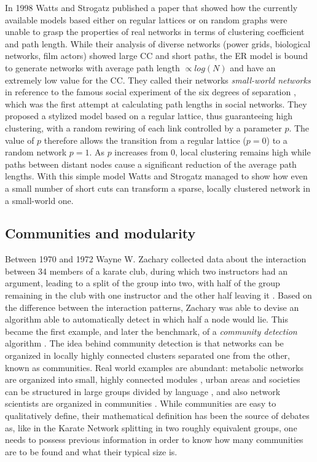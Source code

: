 In 1998 Watts and Strogatz published a paper that showed how the currently available models based either on regular lattices or on random graphs were unable to grasp the properties of real networks in terms of clustering coefficient
and path length\cite{Watts1998}. While their analysis of diverse networks (power grids, biological networks, film actors) showed large CC and short paths, the ER model  \cite{Albert2002} is bound to generate networks
with average path length $\propto log(N)$ and have an extremely low value for the CC. They called their networks \textit{small-world networks} in reference to the famous social experiment of the six degrees
of separation \cite{sixdeg}, which was the first attempt at calculating path lengths in social networks. They proposed a stylized model based on a regular lattice, thus guaranteeing high clustering, with a random rewiring
of each link controlled by a parameter $p$. The value of $p$ therefore allows the transition from a regular lattice ($p=0$) to a random network $p=1$. As $p$ increases from 0, local clustering remains high while
paths between distant nodes cause a significant reduction of the average path lengths. With this simple model Watts and Strogatz managed to show how even a small number of short cuts
can transform a sparse, locally clustered network in a small-world one.


\subsection{Communities and modularity}
Between 1970 and 1972 Wayne W. Zachary collected data about the interaction between 34 members of a karate club, during which two instructors had an argument, leading to a split of the group into two, with half of the group
remaining in the club with one instructor and the other half leaving it  \cite{10.2307/3629752}. Based on the difference between the interaction patterns, Zachary was able to devise an algorithm able to automatically
detect in which half a node would lie. This became the first example, and later the benchmark, of a \textit{community detection} algorithm \cite{Fortunato201075}. The idea behind community detection is that networks can be organized in locally highly connected clusters separated one from the other, known as communities. Real world examples are abundant:
metabolic networks are organized into small, highly connected modules \cite{Ravasz2002}, urban areas and societies can be structured in large groups divided by language \cite{1742-5468-2008-10-P10008},  and also network scientists are organized in communities \cite{physics/0605087}. While
communities are easy to qualitatively define, their mathematical definition has been the source of debates as, like in the Karate Network splitting in two roughly equivalent groups, one needs to possess previous information
in order to know how many communities are to be found and what their typical size is.
    
